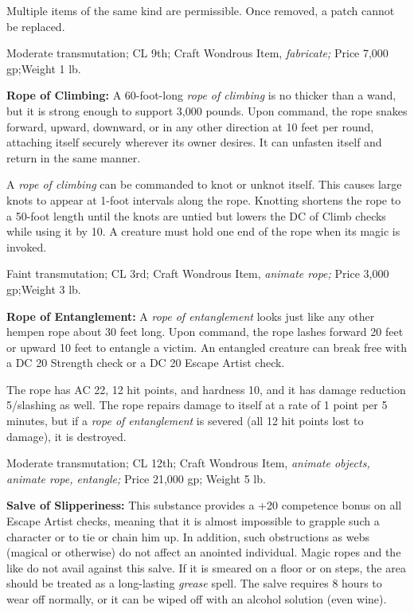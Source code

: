 \documentclass{article}
\begin{document}
Multiple items of the same kind are permissible. Once removed, a patch cannot be 
replaced.

Moderate transmutation; CL 9th; Craft Wondrous Item, \textit{fabricate; }Price 
7,000 gp;Weight 1 lb.

\textbf{Rope of Climbing:} A 60-foot-long \textit{rope of climbing }is no thicker 
than a wand, but it is strong enough to support 3,000 pounds. Upon command, the 
rope snakes forward, upward, downward, or in any other direction at 10 feet per 
round, attaching itself securely wherever its owner desires. It can unfasten itself 
and return in the same manner.

A \textit{rope of climbing }can be commanded to knot or unknot itself. This causes 
large knots to appear at 1-foot intervals along the rope. Knotting shortens the 
rope to a 50-foot length until the knots are untied but lowers the DC of Climb 
checks while using it by 10. A creature must hold one end of the rope when its 
magic is invoked.

Faint transmutation; CL 3rd; Craft Wondrous Item, \textit{animate rope; }Price 
3,000 gp;Weight 3 lb.

\textbf{Rope of Entanglement:} A \textit{rope of entanglement }looks just like 
any other hempen rope about 30 feet long. Upon command, the rope lashes forward 
20 feet or upward 10 feet to entangle a victim. An entangled creature can break 
free with a DC 20 Strength check or a DC 20 Escape Artist check.

The rope has AC 22, 12 hit points, and hardness 10, and it has damage reduction 
5/slashing as well. The rope repairs damage to itself at a rate of 1 point per 
5 minutes, but if a \textit{rope of entanglement }is severed (all 12 hit points 
lost to damage), it is destroyed.

Moderate transmutation; CL 12th; Craft Wondrous Item, \textit{animate objects, 
animate rope, entangle; }Price 21,000 gp; Weight 5 lb.

\textbf{Salve of Slipperiness:} This substance provides a +20 competence bonus 
on all Escape Artist checks, meaning that it is almost impossible to grapple such 
a character or to tie or chain him up. In addition, such obstructions as webs (magical 
or otherwise) do not affect an anointed individual. Magic ropes and the like do 
not avail against this salve. If it is smeared on a floor or on steps, the area 
should be treated as a long-lasting \textit{grease }spell. The salve requires 8 
hours to wear off normally, or it can be wiped off with an alcohol solution (even 
wine).
\end{document}
